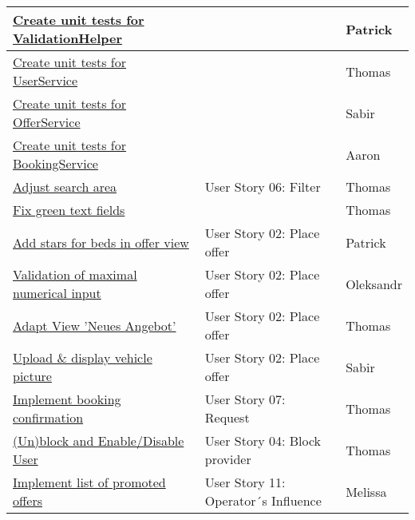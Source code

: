 \begin{tabular}{|l|l|l|}
    \hline
	\href{https://gitlab.rz.uni-bamberg.de/swt/teaching/2021-ws/swt-swl-b/group-a/-/issues/126}{Create unit tests for ValidationHelper} &  & Patrick \\
	\hline
	\href{https://gitlab.rz.uni-bamberg.de/swt/teaching/2021-ws/swt-swl-b/group-a/-/issues/72}{Create unit tests for UserService} &  & Thomas \\
	\hline
	\href{https://gitlab.rz.uni-bamberg.de/swt/teaching/2021-ws/swt-swl-b/group-a/-/issues/54}{Create unit tests for OfferService} &  & Sabir \\
	\hline
	\href{https://gitlab.rz.uni-bamberg.de/swt/teaching/2021-ws/swt-swl-b/group-a/-/issues/83}{Create unit tests for BookingService} &  & Aaron \\
	\hline
	\href{https://gitlab.rz.uni-bamberg.de/swt/teaching/2021-ws/swt-swl-b/group-a/-/issues/135}{Adjust search area}  & User Story 06: Filter & Thomas \\
	\hline
	\href{https://gitlab.rz.uni-bamberg.de/swt/teaching/2021-ws/swt-swl-b/group-a/-/issues/123}{Fix green text fields} &  & Thomas \\
	\hline
	\href{https://gitlab.rz.uni-bamberg.de/swt/teaching/2021-ws/swt-swl-b/group-a/-/issues/58}{Add stars for beds in offer view} & User Story 02: Place offer & Patrick \\
	\hline
	\href{https://gitlab.rz.uni-bamberg.de/swt/teaching/2021-ws/swt-swl-b/group-a/-/issues/145}{Validation of maximal numerical input} & User Story 02: Place offer & Oleksandr \\
	\hline
	\href{https://gitlab.rz.uni-bamberg.de/swt/teaching/2021-ws/swt-swl-b/group-a/-/issues/141}{Adapt View 'Neues Angebot'} & User Story 02: Place offer & Thomas \\
	\hline
	\href{https://gitlab.rz.uni-bamberg.de/swt/teaching/2021-ws/swt-swl-b/group-a/-/issues/67}{Upload \& display vehicle picture} & User Story 02: Place offer & Sabir \\
	\hline
	\href{https://gitlab.rz.uni-bamberg.de/swt/teaching/2021-ws/swt-swl-b/group-a/-/issues/71}{Implement booking confirmation } & User Story 07: Request & Thomas \\
	\hline
	\href{https://gitlab.rz.uni-bamberg.de/swt/teaching/2021-ws/swt-swl-b/group-a/-/issues/115}{(Un)block and Enable/Disable User} & {User Story 04: Block provider} & Thomas \\
	\hline
	\href{https://gitlab.rz.uni-bamberg.de/swt/teaching/2021-ws/swt-swl-b/group-a/-/issues/130}{Implement list of promoted offers} & User Story 11: Operator´s Influence & Melissa \\

\end{tabular}
